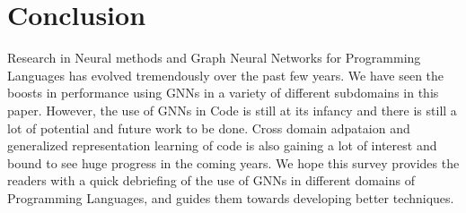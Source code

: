 \documentclass{article}
\begin{document}
\section{Conclusion}
Research in Neural methods and Graph Neural Networks for Programming Languages has evolved tremendously over the past few years. We have seen the boosts in performance using GNNs in a variety of different subdomains in this paper. However, the use of GNNs in Code is still at its infancy and there is still a lot of potential and future work to be done. Cross domain adpataion and generalized representation learning of code is also gaining a lot of interest and bound to see huge progress in the coming years. We hope this survey provides the readers with a quick debriefing of the use of GNNs in different domains of Programming Languages, and guides them towards developing better techniques.



\end{document}
